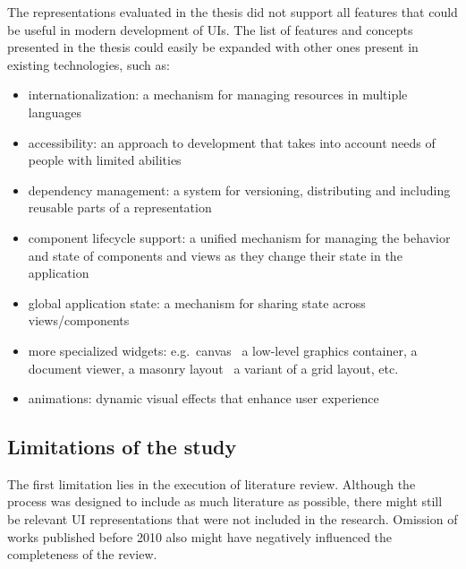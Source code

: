 The representations evaluated in the thesis did not support all features that could be useful in modern development of UIs.
The list of features and concepts presented in the thesis could easily be expanded with other ones present in existing technologies, such as:
\begin{itemize}
    \item internationalization: a mechanism for managing resources in multiple languages
    \item accessibility: an approach to development that takes into account needs of people with limited abilities
    \item dependency management: a system for versioning, distributing and including reusable parts of a representation
    \item component lifecycle support: a unified mechanism for managing the behavior and state of components and views as they change their state in the application
    \item global application state: a mechanism for sharing state across views/components
    \item more specialized widgets: e.g.\ canvas \textendash\ a low-level graphics container, a document viewer, a masonry layout \textendash\ a variant of a grid layout, etc.
    \item animations: dynamic visual effects that enhance user experience
\end{itemize}

\subsection{Limitations of the study}\label{subsec:limitations-of-the-study}

The first limitation lies in the execution of literature review.
Although the process was designed to include as much literature as possible, there might still be relevant UI representations that were not included in the research.
Omission of works published before 2010 also might have negatively influenced the completeness of the review.

